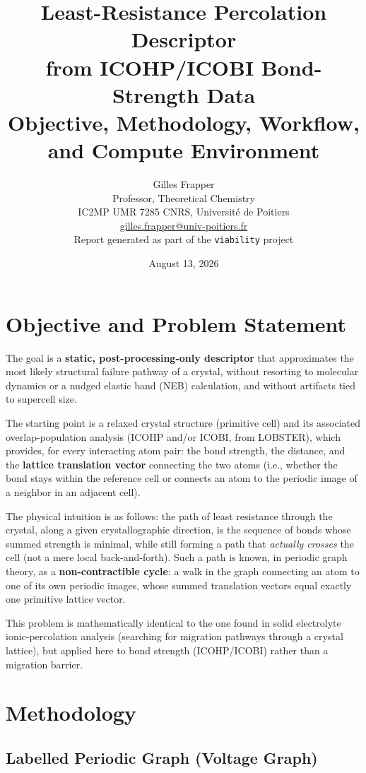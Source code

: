 \documentclass[11pt,a4paper]{article}
\title{\bfseries Least-Resistance Percolation Descriptor \\
from ICOHP/ICOBI Bond-Strength Data \\
\large Objective, Methodology, Workflow, and Compute Environment}
\author{Gilles Frapper \\ Professor, Theoretical Chemistry \\ IC2MP UMR 7285 CNRS, Université de Poitiers \\ \href{mailto:gilles.frapper@univ-poitiers.fr}{gilles.frapper@univ-poitiers.fr}\\[4pt] \small Report generated as part of the \texttt{viability} project}
\date{August 13, 2026}
\begin{document}
\maketitle

\tableofcontents
\newpage

\section{Objective and Problem Statement}

The goal is a \textbf{static, post-processing-only descriptor} that
approximates the most likely structural failure pathway of a crystal,
without resorting to molecular dynamics or a nudged elastic band (NEB)
calculation, and without artifacts tied to supercell size.

The starting point is a relaxed crystal structure (primitive cell) and its
associated overlap-population analysis (ICOHP and/or ICOBI, from LOBSTER),
which provides, for every interacting atom pair: the bond strength, the
distance, and the \textbf{lattice translation vector} connecting the two
atoms (i.e., whether the bond stays within the reference cell or connects
an atom to the periodic image of a neighbor in an adjacent cell).

The physical intuition is as follows: the path of least resistance through
the crystal, along a given crystallographic direction, is the sequence of
bonds whose summed strength is minimal, while still forming a path that
\emph{actually crosses} the cell (not a mere local back-and-forth). Such a
path is known, in periodic graph theory, as a \textbf{non-contractible
cycle}: a walk in the graph connecting an atom to one of its own periodic
images, whose summed translation vectors equal exactly one primitive
lattice vector.

This problem is mathematically identical to the one found in solid
electrolyte ionic-percolation analysis (searching for migration pathways
through a crystal lattice), but applied here to bond strength (ICOHP/ICOBI)
rather than a migration barrier.

\section{Methodology}

\subsection{Labelled Periodic Graph (Voltage Graph)}
\end{document}
